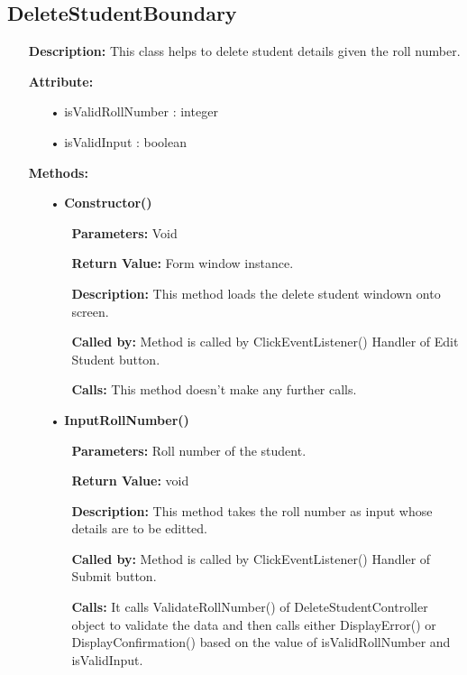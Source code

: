 \documentclass{scrreprt}
\begin{document}
\subsection{DeleteStudentBoundary}
\begin{enumerate}
\item[] \textbf{Description:} This class helps to delete student details given the roll number.
\item[] \textbf{Attribute:} 
\begin{itemize}
\item [•] isValidRollNumber : integer
\item [•] isValidInput : boolean
\end{itemize}
\item [] \textbf{Methods:}
\begin{itemize}
\item [•] \textbf{Constructor()}
\begin{itemize}
\item [] \textbf{Parameters:} Void
\item [] \textbf{Return Value:} Form window instance.
\item [] \textbf{Description:} This method loads the delete student windown onto screen.
\item [] \textbf{Called by:} Method is called by ClickEventListener() Handler of Edit Student button.
\item [] \textbf{Calls:} This method doesn't make any further calls.
\end{itemize}
\end{itemize}
\begin{itemize}
\item [•] \textbf{InputRollNumber()}
\begin{itemize}
\item [] \textbf{Parameters:} Roll number of the student. 
\item [] \textbf{Return Value:} void
\item [] \textbf{Description:} This method takes the roll number as input whose details are to be editted.
\item [] \textbf{Called by:} Method is called by ClickEventListener() Handler of Submit button.
\item [] \textbf{Calls:} It calls ValidateRollNumber() of DeleteStudentController object to validate the data and then calls either DisplayError() or DisplayConfirmation() based on the value of isValidRollNumber and isValidInput.
\end{itemize}

\end{itemize}
\end{enumerate}
\end{document}

